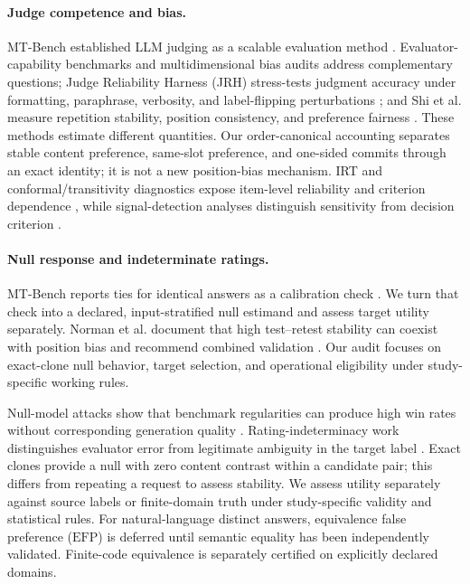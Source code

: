\documentclass[10pt]{article}
\newcommand{\EFP}{\ensuremath{\mathrm{EFP}}}
\begin{document}
\paragraph{Judge competence and bias.}
MT-Bench established LLM judging as a scalable evaluation method \citep{zheng2023mtbench}. Evaluator-capability benchmarks \citep{wang2025dhp} and multidimensional bias audits \citep{ye2025justice} address complementary questions; Judge Reliability Harness (JRH) stress-tests judgment accuracy under formatting, paraphrase, verbosity, and label-flipping perturbations \citep{dev2026harness}; and Shi et al. measure repetition stability, position consistency, and preference fairness \citep{shi2025positionbias}. These methods estimate different quantities. Our order-canonical accounting separates stable content preference, same-slot preference, and one-sided commits through an exact identity; it is not a new position-bias mechanism. IRT and conformal/transitivity diagnostics expose item-level reliability and criterion dependence \citep{choi2026irt,gupta2026conformal}, while signal-detection analyses distinguish sensitivity from decision criterion \citep{cacioli2026signal}.

\paragraph{Null response and indeterminate ratings.}
MT-Bench reports ties for identical answers as a calibration check \citep[Section~3.3]{zheng2023mtbench}. We turn that check into a declared, input-stratified null estimand and assess target utility separately. Norman et al. document that high test--retest stability can coexist with position bias and recommend combined validation \citep{norman2026reliability}. Our audit focuses on exact-clone null behavior, target selection, and operational eligibility under study-specific working rules.

Null-model attacks show that benchmark regularities can produce high win rates without corresponding generation quality \citep{zheng2025null}. Rating-indeterminacy work distinguishes evaluator error from legitimate ambiguity in the target label \citep{guerdan2025indeterminacy}. Exact clones provide a null with zero content contrast within a candidate pair; this differs from repeating a request to assess stability. We assess utility separately against source labels or finite-domain truth under study-specific validity and statistical rules. For natural-language distinct answers, equivalence false preference (\EFP) is deferred until semantic equality has been independently validated. Finite-code equivalence is separately certified on explicitly declared domains.
\end{document}

